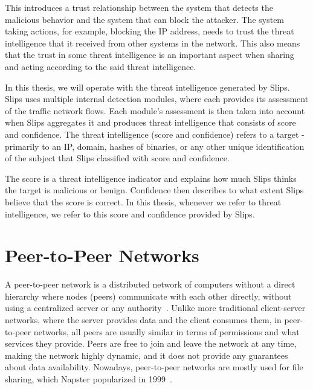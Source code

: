 This introduces a trust relationship between the system that detects the malicious behavior and the system that can block the attacker.
The system taking actions, for example, blocking the IP address, needs to trust the threat intelligence that it received from other systems in the network.
This also means that the trust in some threat intelligence is an important aspect when sharing and acting according to the said threat intelligence.

In this thesis, we will operate with the threat intelligence generated by Slips.
Slips uses multiple internal detection modules, where each provides its assessment of the traffic network flows. 
Each module's assessment is then taken into account when Slips aggregates it and produces threat intelligence that consists of score and confidence.
The threat intelligence (score and confidence) refers to a target - primarily to an IP, domain, hashes of binaries, or any other unique identification of the subject that Slips classified with score and confidence.

The score is a threat intelligence indicator and explains how much Slips thinks the target is malicious or benign.
Confidence then describes to what extent Slips believe that the score is correct.
In this thesis, whenever we refer to threat intelligence, we refer to this score and confidence provided by Slips.

\section{Peer-to-Peer Networks}
\label{sec:peer-to-peer-networks}
A peer-to-peer network is a distributed network of computers without a direct hierarchy where nodes (peers) communicate with each other directly, without using a centralized server or any authority~\cite{schollmeier}.
Unlike more traditional client-server networks, where the server provides data and the client consumes them, in peer-to-peer networks, all peers are usually similar in terms of permissions and what services they provide.
Peers are free to join and leave the network at any time, making the network highly dynamic, and it does not provide any guarantees about data availability.
Nowadays, peer-to-peer networks are mostly used for file sharing, which Napster popularized in 1999~\cite{saroiu}.